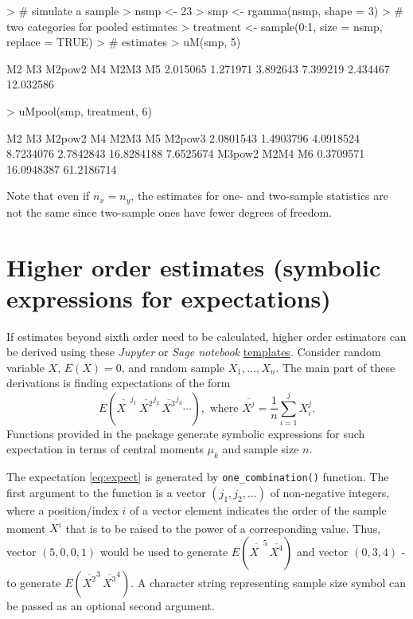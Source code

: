 \documentclass[12pt]{article}
\begin{document}
\begin{Schunk}
\begin{Sinput}
> # simulate a sample
> nsmp <- 23
> smp <- rgamma(nsmp, shape = 3)
> # two categories for pooled estimates
> treatment <- sample(0:1, size = nsmp, replace = TRUE)
> # estimates
> uM(smp, 5)
\end{Sinput}
\begin{Soutput}
       M2        M3    M2pow2        M4      M2M3        M5 
 2.015065  1.271971  3.892643  7.399219  2.434467 12.032586 
\end{Soutput}
\begin{Sinput}
> uMpool(smp, treatment, 6)
\end{Sinput}
\begin{Soutput}
        M2         M3     M2pow2         M4       M2M3         M5     M2pow3 
 2.0801543  1.4903796  4.0918524  8.7234076  2.7842843 16.8284188  7.6525674 
    M3pow2       M2M4         M6 
 0.3709571 16.0948387 61.2186714 
\end{Soutput}
\end{Schunk}

Note that even if $n_x = n_y$, the estimates for one- and two-sample statistics are not the same since two-sample ones have fewer degrees of freedom.

\section{Higher order estimates (symbolic expressions for expectations)}

If estimates beyond sixth order need to be calculated, higher order estimators can be derived using these  \textit{Jupyter} or \textit{Sage notebook} \href{https://github.com/innager/unbiasedMoments}{templates}. Consider random variable $X$, $E(X) = 0$, and random sample $X_1, \dotsc, X_n$. The main part of these derivations is finding expectations of the form
\begin{equation} \label{eq:expect}
E\left(\overline{X^{\phantom{1}}}^{j_1} \, \overline{X^2}^{j_2} \, \overline{X^3}^{j_3} \dotsm \right), \text{ where } \overline{X^j} = \frac{1}{n} \sum_{i = 1}^j X_i^j.
\end{equation}
Functions provided in the package generate symbolic expressions for such expectation in terms of central moments $\mu_k$ and sample size $n$. \par
\vspace{1em}

The expectation \eqref{eq:expect} is generated by \texttt{one\_combination()} function. The first argument to the function is a vector $(j_1, j_2, \dotsc)$ of non-negative integers, where a position/index $i$ of a vector element indicates the order of the sample moment $\overline{X^i}$ that is to be raised to the power of a corresponding value. Thus, vector $(5, 0, 0, 1)$ would be used to generate $E\left(\overline{X^{\phantom{1}}}^5 \, \overline{X^4}\right)$ and vector $(0, 3, 4)$ - to generate $E\left(\overline{X^2}^3 \, \overline{X^3}^4\right)$. A character string representing sample size symbol can be passed as an optional second argument. \par
\vspace{1em}
\end{document}
